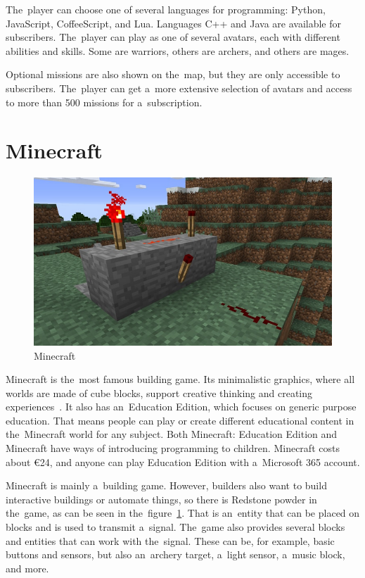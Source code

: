 The~player can choose one of several languages for programming: Python, JavaScript, CoffeeScript, and Lua.
Languages C++ and Java are available for subscribers.
The~player can play as one of several avatars, each with different abilities and skills.
Some are warriors, others are archers, and others are mages.

Optional missions are also shown on the~map, but they are only accessible to subscribers.
The~player can get a~more extensive selection of avatars and access to more than 500 missions for a~subscription.

\pagebreak
\section{Minecraft}
\label{similar-games:minecraft}

\begin{figure}
    \centering
    \includegraphics[width=1\linewidth]{assets/similar-games/minecraft.jpg}
    \caption{Minecraft~\cite{a2022_minecraft}}
    \label{fig:minecraft}
\end{figure}

Minecraft is the~most famous building game.
Its minimalistic graphics, where all worlds are made of cube blocks, support creative thinking and creating experiences~\cite{a2022_minecraft}.
It also has an~Education Edition, which focuses on generic purpose education.
That means people can play or create different educational content in the~Minecraft world for any subject.
Both Minecraft: Education Edition and Minecraft have ways of introducing programming to children.
Minecraft costs about €24, and anyone can play Education Edition with a~Microsoft 365 account.

Minecraft is mainly a~building game.
However, builders also want to build interactive buildings or automate things, so there is Redstone powder in the~game, as can be seen in the~figure~\ref{fig:minecraft}.
That is an~entity that can be placed on blocks and is used to transmit a~signal.
The~game also provides several blocks and entities that can work with the~signal.
These can be, for example, basic buttons and sensors, but also an~archery target, a~light sensor, a~music block, and more.

